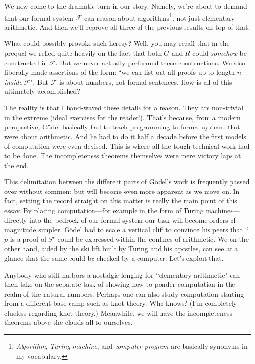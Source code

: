 \documentclass{article}
\theoremstyle{theorem}
\begin{document}
We now come to the dramatic turn in our story. Namely, we're about to demand that our formal system $\mathcal{F}$ can reason about algorithms\footnote{\textit{Algorithm}, \textit{Turing machine}, and \textit{computer program} are basically synonyms in my vocabulary.}, not just elementary arithmetic. And then we'll reprove all three of the previous results on top of that.

What could possibly provoke such heresy? Well, you may recall that in the prequel we relied quite heavily on the fact that both $G$ and $R$ could \textit{somehow} be constructed in $\mathcal{F}$. But we never actually performed these constructions. We also liberally made assertions of the form: ``we can list out all proofs up to length $n$ \textit{inside} $\mathcal{F}$". But $\mathcal{F}$ is about numbers, not formal sentences. How is all of this ultimately accomplished?

The reality is that I hand-waved these details for a reason. They are non-trivial in the extreme (ideal exercises for the reader!). That's because, from a modern perspective, Gödel basically had to teach programming to formal systems that were about arithmetic. And he had to do it half a decade before the first models of computation were even devised. This is where all the tough technical work had to be done. The incompleteness theorems themselves were mere victory laps at the end.

This delimitation between the different parts of Gödel's work is frequently passed over without comment but will become even more apparent as we move on. In fact, setting the record straight on this matter is really the main point of this essay. By placing computation---for example in the form of Turing machines---directly into the bedrock of our formal system our task will become orders of magnitude simpler. Gödel had to scale a vertical cliff to convince his peers that ``$p$ is a proof of $S$" could be expressed within the confines of arithmetic. We on the other hand, aided by the ski lift built by Turing and his apostles, can see at a glance that the same could be checked by a computer. Let's exploit that.

Anybody who still harbors a nostalgic longing for ``elementary arithmetic" can then take on the separate task of showing how to ponder computation in the realm of the natural numbers. Perhaps one can also study computation starting from a different base camp such as knot theory. Who knows? (I'm completely clueless regarding knot theory.) Meanwhile, we will have the incompleteness theorems above the clouds all to ourselves.
\end{document}
